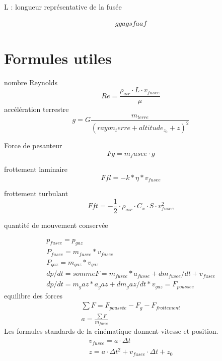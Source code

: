 \documentclass[12pt,a4paper]{article}
\begin{document}
\medbreak

\medbreak

\medbreak

\medbreak
L : longueur représentative de la fusée


\begin{eqnarray}
ggagsfaaf
\end{eqnarray}

\section{Formules utiles}
nombre Reynolds
\begin{equation}
Re=\frac{\rho_{air} \cdot L \cdot v_{fusee}}{\mu}
\end{equation}
accélération terrestre
\begin{equation}
g= G \frac{m_{terre}}{(rayon_terre+altitude_{z_0}+z)^2}
\end{equation}

Force de pesanteur
\begin{equation}
Fg=m_fusee \cdot g
\end{equation}

frottement laminaire
\begin{equation}
Ffl=-k*\eta*v_{fusee}
\end{equation}

frottement turbulant
\begin{equation}
Fft=-\frac{1}{2} \cdot \rho_{air} \cdot C_x \cdot S \cdot v_{fusee}^2
\end{equation}

quantité de mouvement conservée

\begin{eqnarray}
p_{fusee}=p_{gaz}\\
P_{fusee}=m_{fusee}*v_{fusee}\\
P_{gaz}=m_{gaz}*v_{gaz}\\
dp/dt=somme F=m_{fusee}*a_{fusse}+ d m_{fusee}/dt+v_{fusee}\\
dp/dt=m_gaz*a_gaz+d m_gaz/dt*v_{gaz}=F_{poussee}
\end{eqnarray}
equilibre des forces
\begin{eqnarray}
\sum F=F_{poussée}-F_g-F_{frottement}\\
a=\frac{\sum F}{m_{fusee}}
\end{eqnarray}
Les formules standards de la cinématique donnent vitesse et position. 
\begin{eqnarray}
v_{fusee}=a \cdot \Delta t\\
z=a \cdot \Delta t^2+v_{fusee} \cdot \Delta t+z_0
\end{eqnarray}
\end{document}
